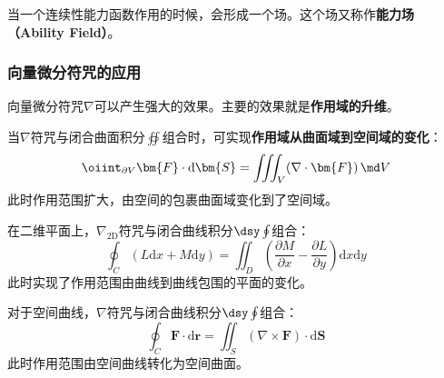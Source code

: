 \begin{remark}
    当一个连续性能力函数作用的时候，会形成一个场。这个场又称作\textbf{能力场（Ability Field）}。
\end{remark}

\subsubsection{向量微分符咒的应用}
向量微分符咒$\nabla$可以产生强大的效果。主要的效果就是\textbf{作用域的升维}。

\begin{theorem}[高斯符咒公式]
    当$\nabla$符咒与闭合曲面积分$\displaystyle\oiint$组合时，可实现\textbf{作用域从曲面域到空间域的变化}：
    \begin{equation}
        \oiint_{\partial V} \bm{F}\cdot\mathrm{d}\bm{S}=\iiint_V (\nabla\cdot\bm{F}) \,\md V
    \end{equation}
    此时作用范围扩大，由空间的包裹曲面域变化到了空间域。
\end{theorem}

\begin{theorem}[格林符咒公式]
    在二维平面上，$\nabla_{\text{2D}}$符咒与闭合曲线积分$\dsy\oint$组合：
    \begin{equation}
        \oint_C (L\mathrm{d}x + M\mathrm{d}y) = \iint_D \left(\dfrac{\partial M}{\partial x} - \dfrac{\partial L}{\partial y}\right) \mathrm{d}x\mathrm{d}y
    \end{equation}
    此时实现了作用范围由曲线到曲线包围的平面的变化。
\end{theorem}

\begin{theorem}[斯托克斯符咒公式]
    对于空间曲线，$\nabla$符咒与闭合曲线积分$\dsy\oint$组合：
    \begin{equation}
        \oint_C \bm{F}\cdot\mathrm{d}\bm{r} = \iint_S (\nabla\times\bm{F})\cdot\mathrm{d}\bm{S}
    \end{equation}
    此时作用范围由空间曲线转化为空间曲面。
\end{theorem}


